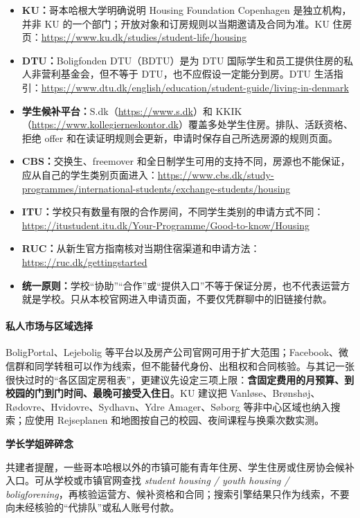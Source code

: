 \begin{itemize}[leftmargin=2em,itemsep=3pt]
  \item \textbf{KU：}哥本哈根大学明确说明 Housing Foundation Copenhagen 是独立机构，并非 KU 的一个部门；开放对象和订房规则以当期邀请及合同为准。KU 住房页：\url{https://www.ku.dk/studies/student-life/housing}
  \item \textbf{DTU：}Boligfonden DTU（BDTU）是为 DTU 国际学生和员工提供住房的私人非营利基金会，但不等于 DTU，也不应假设一定能分到房。DTU 生活指引：\url{https://www.dtu.dk/english/education/student-guide/living-in-denmark}
  \item \textbf{学生候补平台：}S.dk（\url{https://www.s.dk}）和 KKIK（\url{https://www.kollegierneskontor.dk}）覆盖多处学生住房。排队、活跃资格、拒绝 offer 和在读证明规则会更新，申请时保存自己所选房源的规则页面。
  \item \textbf{CBS：}交换生、freemover 和全日制学生可用的支持不同，房源也不能保证，应从自己的学生类别页面进入：\url{https://www.cbs.dk/study-programmes/international-students/exchange-students/housing}
  \item \textbf{ITU：}学校只有数量有限的合作房间，不同学生类别的申请方式不同：\url{https://itustudent.itu.dk/Your-Programme/Good-to-know/Housing}
  \item \textbf{RUC：}从新生官方指南核对当期住宿渠道和申请方法：\url{https://ruc.dk/gettingstarted}
  \item \textbf{统一原则：}学校“协助”“合作”或“提供入口”不等于保证分房，也不代表运营方就是学校。只从本校官网进入申请页面，不要仅凭群聊中的旧链接付款。
\end{itemize}

\paragraph{私人市场与区域选择}

BoligPortal、Lejebolig 等平台以及房产公司官网可用于扩大范围；Facebook、微信群和同学转租可以作为线索，但不能替代身份、出租权和合同核验。与其记一张很快过时的“各区固定房租表”，更建议先设定三项上限：\textbf{含固定费用的月预算、到校园的门到门时间、最晚可接受入住日}。KU 建议把 Vanløse、Brønshøj、Rødovre、Hvidovre、Sydhavn、Ydre Amager、Søborg 等非中心区域也纳入搜索；应使用 Rejseplanen 和地图按自己的校园、夜间课程与换乘次数实测。

\begin{grayleftbox}\textbf{学长学姐碎碎念}
\experiencenotice

共建者提醒，一些哥本哈根以外的市镇可能有青年住房、学生住房或住房协会候补入口。可从学校或市镇官网查找 \emph{student housing / youth housing / boligforening}，再核验运营方、候补资格和合同；搜索引擎结果只作为线索，不要向未经核验的“代排队”或私人账号付款。
\end{grayleftbox}

